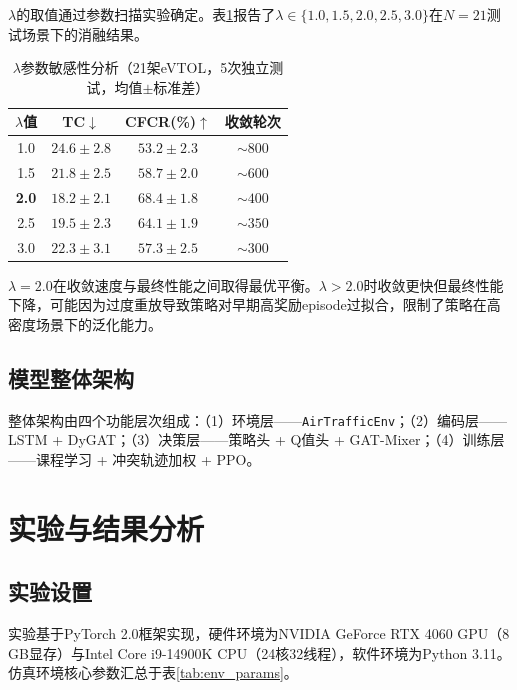 \documentclass[12pt,a4paper,UTF8]{ctexart}
\begin{document}
$\lambda$的取值通过参数扫描实验确定。表\ref{tab:lambda_tuning}报告了$\lambda \in \{1.0, 1.5, 2.0, 2.5, 3.0\}$在$N=21$测试场景下的消融结果。

\begin{table}[H]
    \centering
    \caption{$\lambda$参数敏感性分析（21架eVTOL，5次独立测试，均值$\pm$标准差）}
    \label{tab:lambda_tuning}
    \begin{tabular}{|c|c|c|c|}
        \hline
        \textbf{$\lambda$值} & \textbf{TC$\downarrow$} & \textbf{CFCR(\%)$\uparrow$} & \textbf{收敛轮次} \\
        \hline
        1.0 & $24.6 \pm 2.8$ & $53.2 \pm 2.3$ & $\sim800$ \\
        1.5 & $21.8 \pm 2.5$ & $58.7 \pm 2.0$ & $\sim600$ \\
        \textbf{2.0} & $\mathbf{18.2 \pm 2.1}$ & $\mathbf{68.4 \pm 1.8}$ & $\sim400$ \\
        2.5 & $19.5 \pm 2.3$ & $64.1 \pm 1.9$ & $\sim350$ \\
        3.0 & $22.3 \pm 3.1$ & $57.3 \pm 2.5$ & $\sim300$ \\
        \hline
    \end{tabular}
\end{table}

$\lambda=2.0$在收敛速度与最终性能之间取得最优平衡。$\lambda>2.0$时收敛更快但最终性能下降，可能因为过度重放导致策略对早期高奖励episode过拟合，限制了策略在高密度场景下的泛化能力。

\subsection{模型整体架构}

整体架构由四个功能层次组成：（1）环境层——\texttt{AirTrafficEnv}；（2）编码层——LSTM + DyGAT；（3）决策层——策略头 + Q值头 + GAT-Mixer；（4）训练层——课程学习 + 冲突轨迹加权 + PPO。

\section{实验与结果分析}

\subsection{实验设置}

实验基于PyTorch 2.0框架实现，硬件环境为NVIDIA GeForce RTX 4060 GPU（8 GB显存）与Intel Core i9-14900K CPU（24核32线程），软件环境为Python 3.11。仿真环境核心参数汇总于表\ref{tab:env_params}。
\end{document}
